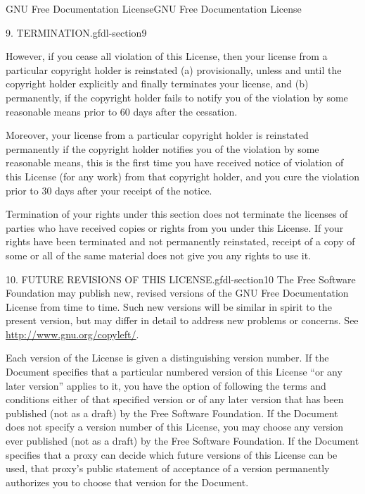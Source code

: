 \documentclass[10pt,]{book}
\numberwithin{equation}{section}
\begin{document}
\begin{appendixptx}{GNU Free Documentation License}{}{GNU Free Documentation License}{}{}
\begin{paragraphs}{9. TERMINATION.}{gfdl-section9}
\par
\hypertarget{p-571}{}%
However, if you cease all violation of this License, then your license from a particular copyright holder is reinstated (a) provisionally, unless and until the copyright holder explicitly and finally terminates your license, and (b) permanently, if the copyright holder fails to notify you of the violation by some reasonable means prior to 60 days after the cessation.%
\par
\hypertarget{p-572}{}%
Moreover, your license from a particular copyright holder is reinstated permanently if the copyright holder notifies you of the violation by some reasonable means, this is the first time you have received notice of violation of this License (for any work) from that copyright holder, and you cure the violation prior to 30 days after your receipt of the notice.%
\par
\hypertarget{p-573}{}%
Termination of your rights under this section does not terminate the licenses of parties who have received copies or rights from you under this License. If your rights have been terminated and not permanently reinstated, receipt of a copy of some or all of the same material does not give you any rights to use it.%
\end{paragraphs}%
\begin{paragraphs}{10. FUTURE REVISIONS OF THIS LICENSE.}{gfdl-section10}%
\hypertarget{p-574}{}%
The Free Software Foundation may publish new, revised versions of the GNU Free Documentation License from time to time. Such new versions will be similar in spirit to the present version, but may differ in detail to address new problems or concerns. See \url{http://www.gnu.org/copyleft/}.%
\par
\hypertarget{p-575}{}%
Each version of the License is given a distinguishing version number. If the Document specifies that a particular numbered version of this License ``or any later version'' applies to it, you have the option of following the terms and conditions either of that specified version or of any later version that has been published (not as a draft) by the Free Software Foundation. If the Document does not specify a version number of this License, you may choose any version ever published (not as a draft) by the Free Software Foundation. If the Document specifies that a proxy can decide which future versions of this License can be used, that proxy's public statement of acceptance of a version permanently authorizes you to choose that version for the Document.%
\end{paragraphs}%

\end{appendixptx}
\end{document}
